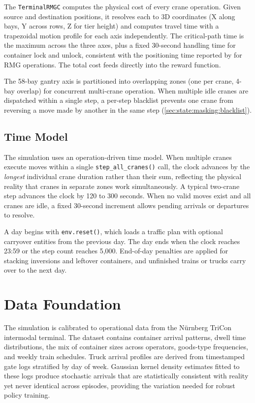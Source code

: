 The \texttt{TerminalRMGC} computes the physical cost of every crane operation. Given source and destination positions, it resolves each to 3D coordinates (X along bays, Y across rows, Z for tier height) and computes travel time with a trapezoidal motion profile for each axis independently. The critical-path time is the maximum across the three axes, plus a fixed 30-second handling time for container lock and unlock, consistent with the positioning time reported by \textcite{stahlbock2008operations} for RMG operations. The total cost feeds directly into the reward function.

The 58-bay gantry axis is partitioned into overlapping zones (one per crane, 4-bay overlap) for concurrent multi-crane operation. When multiple idle cranes are dispatched within a single step, a per-step blacklist prevents one crane from reversing a move made by another in the same step (\cref{sec:state:masking:blacklist}).

\subsection{Time Model}
\label{sec:sys:env:time}

The simulation uses an operation-driven time model. When multiple cranes execute moves within a single \texttt{step\_all\_cranes()} call, the clock advances by the \emph{longest} individual crane duration rather than their sum, reflecting the physical reality that cranes in separate zones work simultaneously. A typical two-crane step advances the clock by 120 to 300 seconds. When no valid moves exist and all cranes are idle, a fixed 30-second increment allows pending arrivals or departures to resolve.

A day begins with \texttt{env.reset()}, which loads a traffic plan with optional carryover entities from the previous day. The day ends when the clock reaches 23:59 or the step count reaches 5{,}000. End-of-day penalties are applied for stacking inversions and leftover containers, and unfinished trains or trucks carry over to the next day.

\section{Data Foundation}
\label{sec:sys:data}

The simulation is calibrated to operational data from the N\"urnberg TriCon intermodal terminal. The dataset contains container arrival patterns, dwell time distributions, the mix of container sizes across operators, goods-type frequencies, and weekly train schedules. Truck arrival profiles are derived from timestamped gate logs stratified by day of week. Gaussian kernel density estimates fitted to these logs produce stochastic arrivals that are statistically consistent with reality yet never identical across episodes, providing the variation needed for robust policy training.

